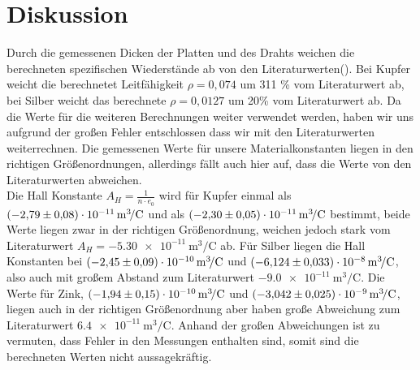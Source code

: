 \section{Diskussion}
Durch die gemessenen Dicken der Platten und des Drahts weichen die berechneten spezifischen Wiederstände ab von den Literaturwerten(\cite{Literaturwerte_Spezifische_Wiederstände}).
Bei Kupfer weicht die berechnetet Leitfähigkeit $\rho = 0,074$ um 311 \% vom Literaturwert ab, bei Silber weicht das berechnete $\rho = 0,0127$ um 20\% vom Literaturwert ab.
Da die Werte für die weiteren Berechnungen weiter verwendet werden, haben wir uns aufgrund der großen Fehler entschlossen dass wir mit den Literaturwerten weiterrechnen.
Die gemessenen Werte für unsere Materialkonstanten liegen in den richtigen Größenordnungen, allerdings fällt auch hier auf, dass die Werte von den Literaturwerten abweichen.\\
Die Hall Konstante $A_H = \frac{1}{n\cdot e_0}$ wird für Kupfer einmal als $\SI{-2.79\pm 0.08 e-11}{\cubic \metre \per \coulomb}$ und als $\SI{-2.30\pm0.05 e-11}{\cubic \metre \per \coulomb}$ bestimmt, beide Werte liegen zwar in der richtigen Größenordnung, weichen jedoch stark vom Literaturwert $A_H = \SI{-5.30 e-11}{\cubic \metre \per \coulomb}$ ab.
Für Silber liegen die Hall Konstanten bei  $\SI{-2.45 \pm 0.09 e-10}{\cubic \metre \per \coulomb}$ und $\SI{-6.124\pm 0.033 e-08}{\cubic \metre \per \coulomb}$, also auch mit großem Abstand zum Literaturwert $\SI{-9,0 e-11}{\cubic \metre \per \coulomb}$.
Die Werte für Zink, $\SI{-1.94\pm 0.15 e-10}{\cubic \metre \per \coulomb}$ und $\SI{-3.042\pm0.025 e-09}{\cubic \metre \per \coulomb}$, liegen auch in der richtigen Größenordnung aber haben große Abweichung zum Literaturwert $\SI{6,4 e-11}{\cubic \metre \per \coulomb}$.
Anhand der großen Abweichungen ist zu vermuten, dass Fehler in den Messungen enthalten sind, somit sind die berechneten Werten nicht aussagekräftig.
\label{sec:Diskussion}
